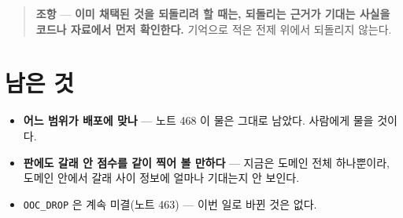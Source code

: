 \documentclass[11pt]{article}
\begin{document}
\begin{quote}
\textbf{조항} --- \textbf{이미 채택된 것을 되돌리려 할 때는, 되돌리는
근거가 기대는 사실을 코드나 자료에서 먼저 확인한다.} 기억으로 적은
전제 위에서 되돌리지 않는다.
\end{quote}

\section*{남은 것}

\begin{itemize}
\item \textbf{어느 범위가 배포에 맞나} --- 노트 468 이 물은 그대로 남았다.
사람에게 물을 것이다.
\item \textbf{판에도 갈래 안 점수를 같이 찍어 볼 만하다} --- 지금은
도메인 전체 하나뿐이라, 도메인 안에서 갈래 사이 정보에 얼마나 기대는지
안 보인다.
\item \texttt{OOC\_DROP} 은 계속 미결(노트 463) --- 이번 일로 바뀐 것은
없다.
\end{itemize}
\end{document}
